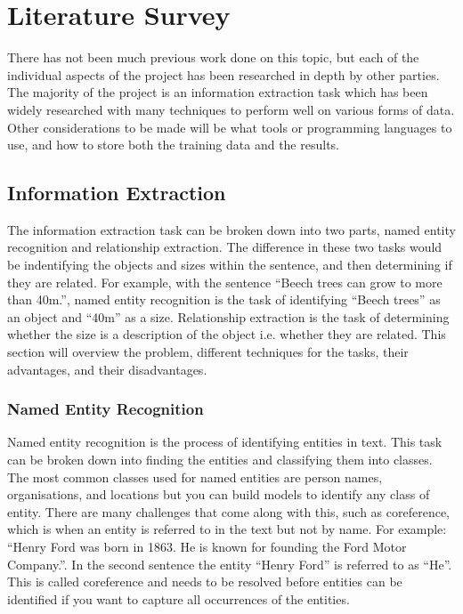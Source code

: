 \documentclass[11pt,oneside]{book}
\begin{document}
\chapter{Literature Survey}

There has not been much previous work done on this topic, but each of the individual aspects of the project has been researched in depth by other parties. The majority of the project is an information extraction task which has been widely researched with many techniques to perform well on various forms of data. Other considerations to be made will be what tools or programming languages to use, and how to store both the training data and the results.

\section{Information Extraction}
The information extraction task can be broken down into two parts, named entity recognition and relationship extraction. The difference in these two tasks would be indentifying the objects and sizes within the sentence, and then determining if they are related. For example, with the sentence “Beech trees can grow to more than 40m.”, named entity recognition is the task of identifying “Beech trees” as an object and “40m” as a size. Relationship extraction is the task of determining whether the size is a description of the object i.e. whether they are related. This section will overview the problem, different techniques for the tasks, their advantages, and their disadvantages.

\subsection{Named Entity Recognition}

Named entity recognition is the process of identifying entities in text. This task can be broken down into finding the entities and classifying them into classes. The most common classes used for named entities are person names, organisations, and locations but you can build models to identify any class of entity. There are many challenges that come along with this, such as coreference, which is when an entity is referred to in the text but not by name. For example: “Henry Ford was born in 1863. He is known for founding the Ford Motor Company.”. In the second sentence the entity “Henry Ford” is referred to as “He”. This is called coreference and needs to be resolved before entities can be identified if you want to capture all occurrences of the entities.
\end{document}

